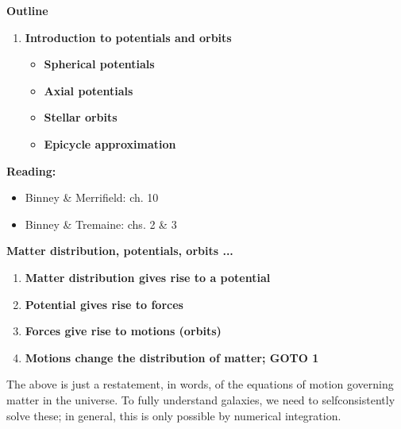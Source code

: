 \documentclass[letterpaper,landscape]{slides}
\begin{document}

\begin{slide}
\begin{center}
\bfseries
{\large {\color{blue} Outline} }
\end{center}
\vskip -0.3in

\begin{enumerate}
   \item {\bf \color{blue} Introduction to potentials and orbits}
     \begin{itemize}
             \item {\bf Spherical potentials}
             \item {\bf Axial potentials}
             \item {\bf Stellar orbits}
             \item {\bf Epicycle approximation}
     \end{itemize}
\end{enumerate}

{\color{red} \bf Reading:}
\begin{itemize}
   \item {\color{blue} Binney \& Merrifield:} ch. 10
   \item {\color{blue} Binney \& Tremaine:} chs. 2 \& 3
\end{itemize}

\vfill
\end{slide}
 

\begin{slide}
\begin{center}
\bfseries
{\large {\color{blue} Matter distribution, potentials, orbits ...} }
\end{center}
\vskip -0.3in

\begin{enumerate}
        \item {\bf Matter distribution gives rise to a potential}
        \item {\bf Potential gives rise to forces}
        \item {\bf Forces give rise to motions (orbits)}
        \item {\bf Motions change the distribution of matter; GOTO 1}
\end{enumerate}

The above is just a restatement, in words, of the equations of motion
governing matter in the universe.  To fully understand galaxies, we need to
selfconsistently solve these; in general, this is only possible by
numerical integration.

\vfill
\end{slide}
 
\end{document}
